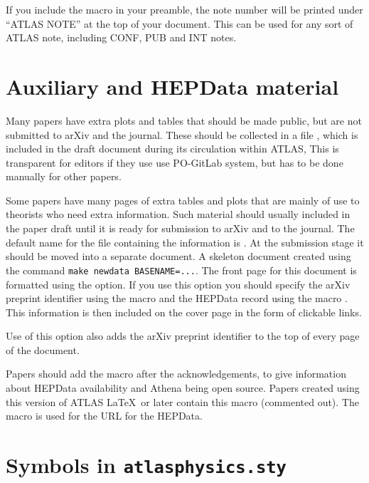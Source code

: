 If you include the macro  in your preamble,
the note number will be printed under \enquote{ATLAS NOTE} at the top of your document.
This can be used for any sort of ATLAS note, including CONF, PUB and INT notes.


\section{Auxiliary and HEPData material}
\label{sec:auxmat}

Many papers have extra plots and tables that should be made public,
but are not submitted to arXiv and the journal.
These should be collected in a file ,
which is included in the draft document during its circulation within ATLAS,
This is transparent for editors if they use use PO-GitLab system,
but has to be done manually for other papers.

Some papers have many pages of extra tables and plots that are mainly of use to theorists
who need extra information.
Such material should usually included in the paper draft until it is ready for
submission to arXiv and to the journal.
The default name for the file containing the information is .
At the submission stage it should be moved into a separate document.
A skeleton document created using the command \verb|make newdata BASENAME=...|.
The front page for this document is formatted using the  option.
If you use this option you should specify the arXiv preprint identifier
using the macro  and the HEPData record using the macro
.
This information is then included on the cover page in the form of clickable links.

Use of this option also adds the arXiv preprint identifier to the top
of every page of the document.

 Papers should add the macro  after the acknowledgements,
to give information about HEPData availability and Athena being open source.
Papers created using this version of ATLAS \LaTeX\ or later contain this macro (commented out).
The macro  is used for the URL for the HEPData.


\section{Symbols in \texttt{atlasphysics.sty}}
\label{sec:atlasphysics}

